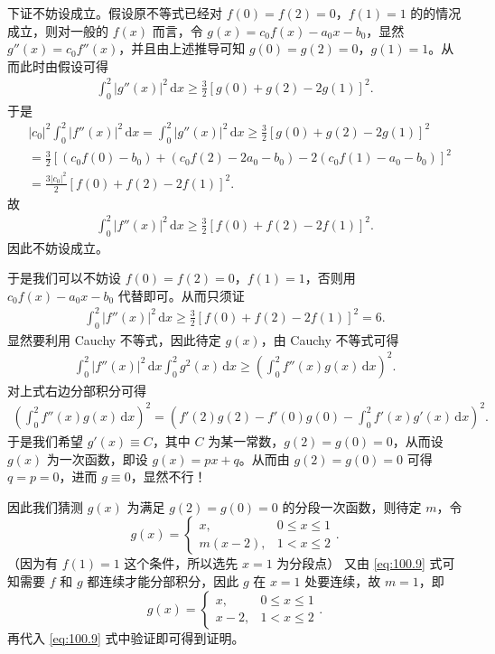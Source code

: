 \documentclass[../../main.tex]{subfiles}
\begin{document}
\begin{remark}
下证不妨设成立。假设原不等式已经对 \(f(0) = f(2) = 0\)，\(f(1) = 1\) 的的情况成立，则对一般的 \(f(x)\) 而言，令 \(g(x) = c_0 f(x) - a_0 x - b_0\)，显然 \(g''(x) = c_0 f''(x)\)，并且由上述推导可知 \(g(0) = g(2) = 0\)，\(g(1) = 1\)。从而此时由假设可得
\begin{align*}
\int_0^2 \left| g''(x) \right|^2 \, \mathrm{d}x \geqslant \frac{3}{2} [g(0) + g(2) - 2g(1)]^2.
\end{align*}
于是
\begin{align*}
&\left| c_0 \right|^2 \int_0^2 \left| f''(x) \right|^2 \, \mathrm{d}x = \int_0^2 \left| g''(x) \right|^2 \, \mathrm{d}x \geqslant \frac{3}{2} \left[ g(0) + g(2) - 2g(1) \right]^2 \\
&= \frac{3}{2} \left[ \left( c_0 f(0) - b_0 \right) + \left( c_0 f(2) - 2a_0 - b_0 \right) - 2 \left( c_0 f(1) - a_0 - b_0 \right) \right]^2 \\
&= \frac{3 \left| c_0 \right|^2}{2} \left[ f(0) + f(2) - 2f(1) \right]^2.
\end{align*}
故
\begin{align*}
\int_0^2 \left| f''(x) \right|^2 \, \mathrm{d}x \geqslant \frac{3}{2} \left[ f(0) + f(2) - 2f(1) \right]^2.
\end{align*}
因此不妨设成立。

于是我们可以不妨设 \(f(0) = f(2) = 0\)，\(f(1) = 1\)，否则用 \(c_0f(x) - a_0x - b_0\) 代替即可。从而只须证
\begin{align*}
\int_0^2 \left| f''(x) \right|^2 \, \mathrm{d}x \geqslant \frac{3}{2} \left[ f(0) + f(2) - 2f(1) \right]^2 = 6.
\end{align*}
显然要利用 Cauchy 不等式，因此待定 \(g(x)\)，由 Cauchy 不等式可得
\begin{align*}
\int_0^2 \left| f''(x) \right|^2 \, \mathrm{d}x \int_0^2 g^2(x) \, \mathrm{d}x \geqslant \left( \int_0^2 f''(x) g(x) \, \mathrm{d}x \right)^2.
\end{align*}
对上式右边分部积分可得
\begin{align}
\left( \int_0^2 f''(x) g(x) \, \mathrm{d}x \right)^2 = \left( f'(2) g(2) - f'(0) g(0) - \int_0^2 f'(x) g'(x) \, \mathrm{d}x \right)^2. \label{eq:100.9}
\end{align}
于是我们希望 \(g'(x) \equiv C\)，其中 \(C\) 为某一常数，\(g(2) = g(0) = 0\)，从而设 \(g(x)\) 为一次函数，即设 \(g(x) = px + q\)。从而由 \(g(2) = g(0) = 0\) 可得 \(q = p = 0\)，进而 \(g \equiv 0\)，显然不行！

因此我们猜测 \(g(x)\) 为满足 \(g(2) = g(0) = 0\) 的分段一次函数，则待定 \(m\)，令
\[
g(x) = 
\begin{cases}
x, & 0 \leqslant x \leqslant 1 \\
m(x - 2), & 1 < x \leqslant 2
\end{cases}.
\]
（因为有 \(f(1) = 1\) 这个条件，所以选先 \(x = 1\) 为分段点）
又由 \eqref{eq:100.9} 式可知需要 \(f\) 和 \(g\) 都连续才能分部积分，因此 \(g\) 在 \(x = 1\) 处要连续，故 \(m = 1\)，即
\[
g(x) = 
\begin{cases}
x, & 0 \leqslant x \leqslant 1 \\
x - 2, & 1 < x \leqslant 2
\end{cases}.
\]
再代入 \eqref{eq:100.9} 式中验证即可得到证明。
\end{remark}
\end{document}
